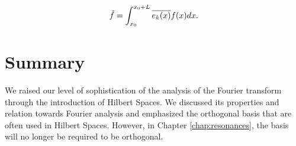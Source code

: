 \begin{equation}
\Tilde{f} = \int^{x_0+L}_{x_0} \overline{e_k(x)} f(x) dx.
\end{equation}

\section{Summary}
We raised our level of sophistication of the analysis of the Fourier transform through the introduction of Hilbert Spaces. We discussed its properties and relation towards Fourier analysis and emphasized the orthogonal basis that are often used in Hilbert Spaces. However, in Chapter \ref{chap:resonances}, the basis will no longer be required to be orthogonal.


